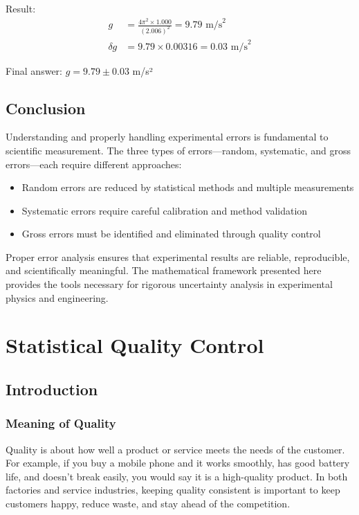\documentclass[twoside]{book}
\begin{document}
Result:
\begin{align}
g &= \frac{4\pi^2 \times 1.000}{(2.006)^2} = 9.79 \text{ m/s}^2 \\
\delta g &= 9.79 \times 0.00316 = 0.03 \text{ m/s}^2
\end{align}

Final answer: $g = 9.79 \pm 0.03$ m/s²

\section{Conclusion}

Understanding and properly handling experimental errors is fundamental to scientific measurement. The three types of errors—random, systematic, and gross errors—each require different approaches:

\begin{itemize}
\item Random errors are reduced by statistical methods and multiple measurements
\item Systematic errors require careful calibration and method validation
\item Gross errors must be identified and eliminated through quality control
\end{itemize}

Proper error analysis ensures that experimental results are reliable, reproducible, and scientifically meaningful. The mathematical framework presented here provides the tools necessary for rigorous uncertainty analysis in experimental physics and engineering.

\chapter{Statistical Quality Control}

\section{Introduction}

\subsection{Meaning of Quality}

Quality is about how well a product or service meets the needs of the customer. For example, if you buy a mobile phone and it works smoothly, has good battery life, and doesn't break easily, you would say it is a high-quality product. In both factories and service industries, keeping quality consistent is important to keep customers happy, reduce waste, and stay ahead of the competition.
\end{document}
